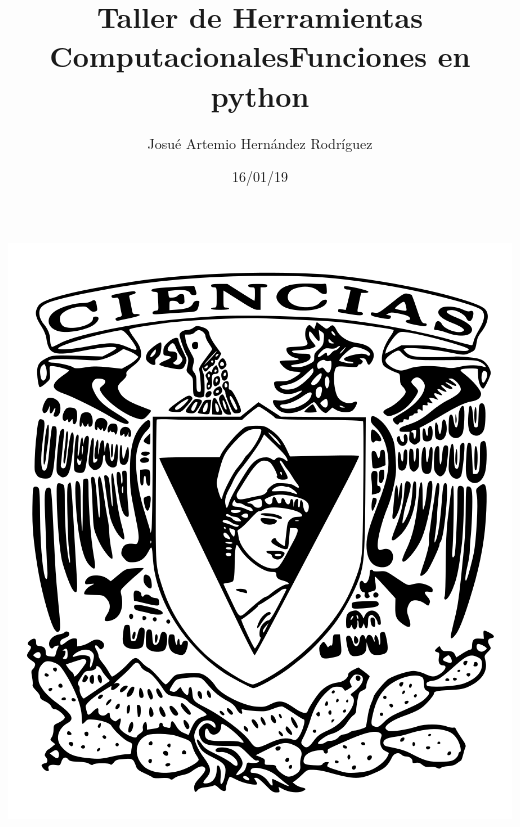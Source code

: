 \documentclass[letterpaper, 12pt, oneside]{article}%
\title{\Huge Taller de Herramientas Computacionales}
\author{Josué Artemio Hernández Rodríguez}%
\date{16/01/19}%
\begin{document}
	\maketitle
	\begin{center}%
		\includegraphics[scale=0.2]{2.png}%
	\end{center}%
	\newpage%
	
	\title{\Huge Funciones en python \\}%
	
\end{document}
